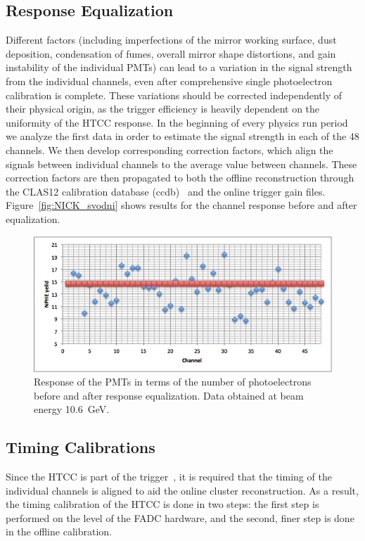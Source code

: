 \subsection{Response Equalization}

Different factors (including imperfections of the mirror working surface, dust deposition, condensation of fumes,
overall mirror shape distortions, and gain instability of the individual PMTs) can lead to a variation in the signal
strength from the individual channels, even after comprehensive single photoelectron calibration is complete.
These variations should be corrected independently of their physical origin, as the trigger efficiency is heavily
dependent on the uniformity of the HTCC response. In the beginning of every physics run period we analyze the
first data in order to estimate the signal strength in each of the 48 channels. We then develop corresponding
correction factors, which align the signals between individual channels to the average value between channels. These
correction factors are then propagated to both the offline reconstruction through the CLAS12 calibration database
(ccdb)~\cite{recon-nim} and the online trigger gain files. Figure~\ref{fig:NICK_svodni} shows results for the
channel response before and after equalization.

\begin{figure}[ht]
\centering
\includegraphics[width=0.99\linewidth]{images/NPE_Equal.png}
\caption{Response of the PMTs in terms of the number of photoelectrons before and after response equalization. Data obtained at beam energy 10.6~GeV.}
\label{fig:NPE_Equal}
\end{figure}

\subsection{Timing Calibrations}

Since the HTCC is part of the trigger~\cite{trigger-nim}, it is required that the timing of the individual
channels is aligned to aid the online cluster reconstruction. As a result, the timing calibration of the HTCC is done in two steps: the first step is performed on the level of the FADC hardware, and the second, finer step is done in the offline calibration.

